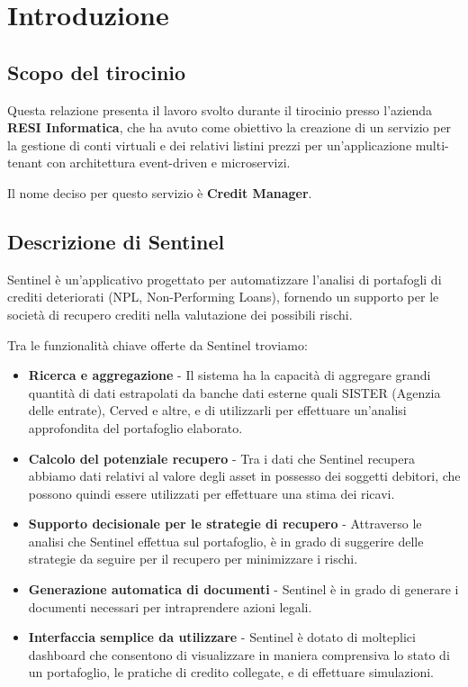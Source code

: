\chapter{Introduzione}

\section{Scopo del tirocinio}
Questa relazione presenta il lavoro svolto durante il tirocinio presso l'azienda \textbf{RESI Informatica}, che ha avuto come obiettivo la creazione di un servizio per la
gestione di conti virtuali e dei relativi listini prezzi per un'applicazione multi-tenant con architettura event-driven e microservizi.

Il nome deciso per questo servizio \`e \textbf{Credit Manager}.

\section{Descrizione di Sentinel}
Sentinel \`e un'applicativo progettato per automatizzare l'analisi di portafogli di crediti deteriorati (NPL, Non-Performing Loans), fornendo un supporto per le societ\`a
di recupero crediti nella valutazione dei possibili rischi.

Tra le funzionalit\`a chiave offerte da Sentinel troviamo:
\begin{itemize}
  \item \textbf{Ricerca e aggregazione} - Il sistema ha la capacit\`a di aggregare grandi quantit\`a di dati estrapolati da banche dati esterne quali SISTER (Agenzia delle entrate), Cerved e altre, e di utilizzarli
    per effettuare un'analisi approfondita del portafoglio elaborato.
  \item \textbf{Calcolo del potenziale recupero} - Tra i dati che Sentinel recupera abbiamo dati relativi al valore degli asset in possesso dei soggetti debitori, che possono
    quindi essere utilizzati per effettuare una stima dei ricavi.
  \item \textbf{Supporto decisionale per le strategie di recupero} - Attraverso le analisi che Sentinel effettua sul portafoglio, \`e in grado di suggerire delle strategie
    da seguire per il recupero per minimizzare i rischi.
  \item \textbf{Generazione automatica di documenti} - Sentinel \`e in grado di generare i documenti necessari per intraprendere azioni legali.
  \item \textbf{Interfaccia semplice da utilizzare} - Sentinel \`e dotato di molteplici dashboard che consentono di visualizzare in maniera comprensiva lo stato di un portafoglio,
    le pratiche di credito collegate, e di effettuare simulazioni.
\end{itemize}

